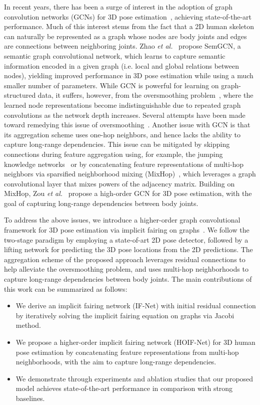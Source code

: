 \documentclass{bmvc2k}
\begin{document}
In recent years, there has been a surge of interest in the adoption of graph convolution networks (GCNs) for 3D pose estimation~\cite{zhao2019semantic,YujunCai:19,zou2020high}, achieving state-of-the-art performance. Much of this interest stems from the fact that a 2D human skeleton can naturally be represented as a graph whose nodes are body joints and edges are connections between neighboring joints. Zhao \textit{et al.}~\cite{zhao2019semantic} propose SemGCN, a semantic graph convolutional network, which learns to capture semantic information encoded in a given graph (i.e. local and global relations between nodes), yielding improved performance in 3D pose estimation while using a much smaller number of parameters. While GCN is powerful for learning on graph-structured data, it suffers, however, from the oversmoothing problem~\cite{Li:18}, where the learned node representations become indistinguishable due to repeated graph convolutions as the network depth increases. Several attempts have been made toward remedying this issue of oversmoothing~\cite{Keyulu:18,Klicpera:19,Lingxiao:20,chen2020simple}. Another issue with GCN is that its aggregation scheme uses one-hop neighbors, and hence lacks the ability to capture long-range dependencies. This issue can be mitigated by skipping connections during feature aggregation using, for example, the jumping knowledge networks~\cite{Keyulu:18} or by concatenating feature representations of multi-hop neighbors via sparsified neighborhood mixing (MixHop)~\cite{abu2019mixhop}, which leverages a graph convolutional layer that mixes powers of the adjacency matrix. Building on MixHop, Zou \textit{et al.}~\cite{zou2020high} propose a high-order GCN for 3D pose estimation, with the goal of capturing long-range dependencies between body joints.

To address the above issues, we introduce a higher-order graph convolutional framework for 3D pose estimation via implicit fairing on graphs~\cite{Desbrun:99}. We follow the two-stage paradigm by employing a state-of-art 2D pose detector, followed by a lifting network for predicting the 3D pose locations from the 2D predictions. The aggregation scheme of the proposed approach leverages residual connections to help alleviate the oversmoothing problem, and uses multi-hop neighborhoods to capture long-range dependencies between body joints. The main contributions of this work can be summarized as follows:

\begin{itemize}
\item We derive an implicit fairing network (IF-Net) with initial residual connection by iteratively solving the implicit fairing equation on graphs via Jacobi method.
\item We propose a higher-order implicit fairing network (HOIF-Net) for 3D human pose estimation by concatenating feature representations from multi-hop neighborhoods, with the aim to capture long-range dependencies.
\item We demonstrate through experiments and ablation studies that our proposed model achieves state-of-the-art performance in comparison with strong baselines.
\end{itemize}
\end{document}
